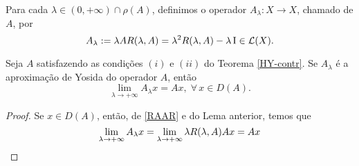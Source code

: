 \begin{definition}
Para cada $\lambda \in (0,+\infty) \cap \rho(A)$, definimos o operador $A_\lambda: X\longrightarrow X$, chamado  de $A$, por 
\begin{equation*}
A_\lambda :=\lambda AR(\lambda,A) =\lambda^2R(\lambda,A) -\lambda \operatorname{I}\in \mathcal{L}(X).
\end{equation*}
\end{definition}

\begin{lemma}\label{Plem3.3}
 Seja $A$ satisfazendo as condições $(i)$ e $(ii)$ do Teorema \ref{HY-contr}. 
Se $A_\lambda$ é a aproximação de Yosida do operador $A$, então
\begin{equation*}
\lim_{\lambda \to +\infty}A_\lambda x=Ax,\; \forall\, x\in D(A).
\end{equation*}
\end{lemma}
\begin{proof}
Se $x\in D(A)$, então, de \eqref{RAAR} e do Lema anterior, temos que
\begin{equation*}
\lim_{\lambda \to +\infty}A_\lambda x=\lim_{\lambda \to +\infty}\lambda R(\lambda,A) Ax=Ax
\end{equation*}
\end{proof}

